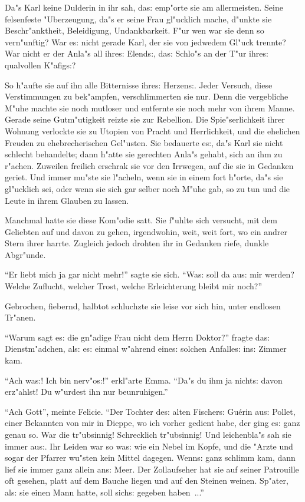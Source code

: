 \documentclass[oneside,12pt]{book}
\newcommand{\s}{s:}%
\begin{document}
Da"s Karl keine Dulderin in ihr sah, da{\s} emp"orte sie am
allermeisten. Seine felsenfeste "Uber\-zeu\-gung, da"s er seine
Frau gl"ucklich mache, d"unkte sie Beschr"anktheit, Beleidigung,
Undankbarkeit. F"ur wen war sie denn so vern"unftig? War e{\s}
nicht gerade Karl, der sie von jedwedem Gl"uck trennte? War nicht
er der Anla"s all ihre{\s} Elend{\s}, da{\s} Schlo"s an der T"ur
ihre{\s} qualvollen K"afig{\s}?

So h"aufte sie auf ihn alle Bitternisse ihre{\s} Herzen{\s}. Jeder
Versuch, diese Verstimmungen zu bek"ampfen, verschlimmerten sie
nur. Denn die vergebliche M"uhe machte sie noch mutloser und
entfernte sie noch mehr von ihrem Manne. Gerade seine
Gutm"utigkeit reizte sie zur Rebellion. Die Spie"serlichkeit ihrer
Wohnung verlockte sie zu Utopien von Pracht und Herrlichkeit, und
die ehelichen Freuden zu ehebrecherischen Gel"usten. Sie bedauerte
e{\s}, da"s Karl sie nicht schlecht behandelte; dann h"atte sie
gerechten Anla"s gehabt, sich an ihm zu r"achen. Zuweilen freilich
erschrak sie vor den Irrwegen, auf die sie in Gedanken geriet. Und
immer mu"ste sie l"acheln, wenn sie in einem fort h"orte, da"s sie
gl"ucklich sei, oder wenn sie sich gar selber noch M"uhe gab, so
zu tun und die Leute in ihrem Glauben zu lassen.

Manchmal hatte sie diese Kom"odie satt. Sie f"uhlte sich versucht,
mit dem Geliebten auf und davon zu gehen, irgendwohin, weit, weit
fort, wo ein andrer Stern ihrer harrte. Zugleich jedoch drohten
ihr in Gedanken riefe, dunkle Abgr"unde.

"`Er liebt mich ja gar nicht mehr!"' sagte sie sich. "`Wa{\s} soll
da au{\s} mir werden? Welche Zuflucht, welcher Trost, welche
Erleichterung bleibt mir noch?"'

Gebrochen, fiebernd, halbtot schluchzte sie leise vor sich hin,
unter endlosen Tr"anen.

"`Warum sagt e{\s} die gn"adige Frau nicht dem Herrn Doktor?"'
fragte da{\s} Dienstm"adchen, al{\s} e{\s} einmal w"ahrend
eine{\s} solchen Anfalle{\s} in{\s} Zimmer kam.

"`Ach wa{\s}! Ich bin nerv"o{\s}!"' erkl"arte Emma. "`Da"s du ihm
ja nicht{\s} davon erz"ahlst! Du w"urdest ihn nur beunruhigen."'

"`Ach Gott"', meinte Felicie. "`Der Tochter de{\s} alten
Fischer{\s} Gu\'erin au{\s} Pollet, einer Bekannten von mir in
Dieppe, wo ich vorher gedient habe, der ging e{\s} ganz genau so.
War die tr"ubsinnig! Schrecklich tr"ubsinnig! Und leichenbla"s sah
sie immer au{\s}. Ihr Leiden war so wa{\s} wie ein Nebel im Kopfe,
und die "Arzte und sogar der Pfarrer wu"sten kein Mittel dagegen.
Wenn{\s} ganz schlimm kam, dann lief sie immer ganz allein an{\s}
Meer. Der Zollaufseher hat sie auf seiner Patrouille oft gesehen,
platt auf dem Bauche liegen und auf den Steinen weinen. Sp"ater,
al{\s} sie einen Mann hatte, soll sich{\s} gegeben haben~..."'
\end{document}
